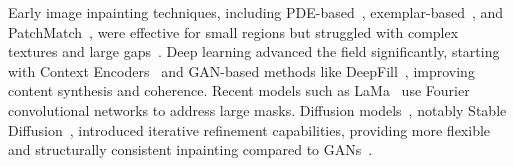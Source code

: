 \vspace{3pt}
Early image inpainting techniques, including PDE-based~\citep{bertalmio2000image}, exemplar-based~\citep{criminisi2004region}, and PatchMatch~\citep{barnes2009patchmatch}, were effective for small regions but struggled with complex textures and large gaps~\citep{jam2021comprehensive, liu2018image}. Deep learning advanced the field significantly, starting with Context Encoders~\citep{feature.learning.by.inpainting} and GAN-based methods like DeepFill~\citep{generative.inpainting, yu2019free}, improving content synthesis and coherence. Recent models such as LaMa~\citep{lama} use Fourier convolutional networks to address large masks. Diffusion models~\citep{NEURIPS2020_4c5bcfec}, notably Stable Diffusion~\citep{rombach2022high}, introduced iterative refinement capabilities, providing more flexible and structurally consistent inpainting compared to GANs~\citep{dhariwal2021diffusion}.


